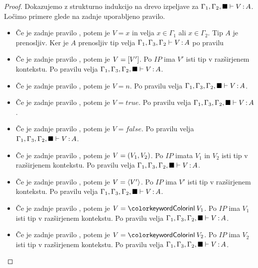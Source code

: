 \begin{proof}
	Dokazujemo z strukturno indukcijo na drevo izpeljave za $\Gamma_1, \Gamma_2, \blacksquare \vdash V \mathinner{:} A$.
	Ločimo primere glede na zadnje uporabljeno pravilo.
	
	\begin{itemize}
		\item Če je zadnje pravilo , potem je $V = x$ in velja $x \in \Gamma_1$ ali $x \in \Gamma_2$.
		Tip $A$ je prenosljiv.
		Ker je $A$ prenosljiv tip velja $\Gamma_1, \Gamma_3, \Gamma_2 \vdash V \mathinner{:} A$ po pravilu 
		
		\item Če je zadnje pravilo , potem je $V = [V']$.
		Po $IP$ ima $V'$ isti tip v razširjenem kontekstu.
		Po pravilu  velja $\Gamma_1, \Gamma_3, \Gamma_2, \blacksquare \vdash V \mathinner{:} A$.
		
		\item Če je zadnje pravilo , potem je $V = n$. Po pravilu  velja $\Gamma_1, \Gamma_3, \Gamma_2, \blacksquare \vdash V \mathinner{:} A$.
		\item Če je zadnje pravilo , potem je $V = true$. Po pravilu  velja $\Gamma_1, \Gamma_3, \Gamma_2, \blacksquare \vdash V \mathinner{:} A$.
		\item Če je zadnje pravilo , potem je $V = false$. Po pravilu  velja $\Gamma_1, \Gamma_3, \Gamma_2, \blacksquare \vdash V \mathinner{:} A$.
		
		\item Če je zadnje pravilo , potem je $V =( V_1 , V_2 )$.
		Po $IP$ imata $V_1$ in $V_2$ isti tip v razširjenem kontekstu.
		Po pravilu  velja $\Gamma_1, \Gamma_3, \Gamma_2, \blacksquare \vdash V \mathinner{:} A$.
		
		\item Če je zadnje pravilo , potem je $V =\langle V' \rangle$.
		Po $IP$ ima $V'$ isti tip v razširjenem kontekstu.
		Po pravilu  velja $\Gamma_1, \Gamma_3, \Gamma_2, \blacksquare \vdash V \mathinner{:} A$.
		
		\item Če je zadnje pravilo , potem je $V = \tminl{V_1}$.
		Po $IP$ ima $V_1$ isti tip v razširjenem kontekstu.
		Po pravilu  velja $\Gamma_1, \Gamma_3, \Gamma_2, \blacksquare \vdash V \mathinner{:} A$.
		
		\item Če je zadnje pravilo , potem je $V = \tminl{V_2}$.
		Po $IP$ ima $V_2$ isti tip v razširjenem kontekstu.
		Po pravilu  velja $\Gamma_1, \Gamma_3, \Gamma_2, \blacksquare \vdash V \mathinner{:} A$.
		

\end{itemize}
\end{proof}
